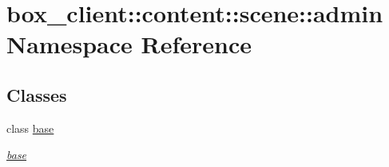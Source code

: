 \hypertarget{namespacebox__client_1_1content_1_1scene_1_1admin}{
\section{box\_\-client::content::scene::admin Namespace Reference}
\label{namespacebox__client_1_1content_1_1scene_1_1admin}
}
\subsection*{Classes}
\begin{DoxyCompactItemize}
\item 
class \hyperlink{classbox__client_1_1content_1_1scene_1_1admin_1_1base}{base}
\begin{DoxyCompactList}\small\item\em \hyperlink{classbox__client_1_1content_1_1scene_1_1admin_1_1base}{base} \item\end{DoxyCompactList}\end{DoxyCompactItemize}
